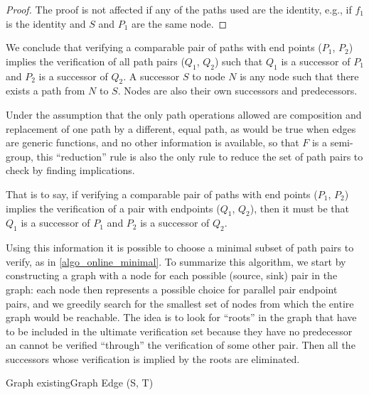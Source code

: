 \documentclass[sigplan,review,anonymous]{acmart}
\begin{document}
{\begin{proof}
The proof is not affected if any of the paths used are the identity, e.g., if $f_1$ is the identity and $S$ and $P_1$ are the same node.
\end{proof}

We conclude that verifying a comparable pair of paths with end points ($P_1$, $P_2$) implies the verification of all path pairs ($Q_1$, $Q_2$) such that $Q_1$ is a successor of $P_1$ and $P_2$ is a successor of $Q_2$. A successor $S$ to node $N$ is any node such that there exists a path from $N$ to $S$. Nodes are also their own successors and predecessors.
 

Under the assumption that the only path operations allowed are composition and replacement of one path by a different, equal path, as would be true when edges are generic functions, and no other information is available, so that $F$ is a semi-group, this ``reduction'' rule is also the only rule to reduce the set of path pairs to check by finding implications.

That is to say, if verifying a comparable pair of paths with end points ($P_1$, $P_2$) implies the verification of a pair with endpoints ($Q_1$, $Q_2$), then it must be that $Q_1$ is a successor of $P_1$ and $P_2$ is a successor of $Q_2$. %

Using this information it is possible to choose a minimal subset of path pairs to verify, as in \ref{algo_online_minimal}.
%
To summarize this algorithm, we start by constructing a graph with a node for each possible (source, sink) pair in the graph: each node then represents a possible choice for parallel pair endpoint pairs, and we greedily search for the smallest set of nodes from which the entire graph would be reachable. The idea is to look for ``roots'' in the graph that have to be included in the ultimate verification set because they have no predecessor an cannot be verified ``through'' the verification of some other pair. Then all the successors whose verification is implied by the roots are eliminated.

\begin{algorithm}
\DontPrintSemicolon
{}
Graph existingGraph\;
Edge (S, T)\;
        

\end{algorithm}}
\end{document}
